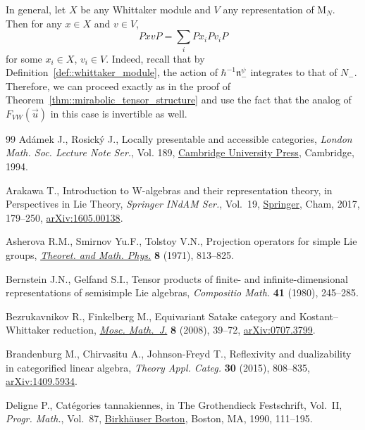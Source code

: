 \documentclass[11pt]{article}
\numberwithin{equation}{section}
\newcommand{\rM}{\mathrm{M}}
\newcommand{\n}{\mathfrak{n}}
\begin{document}
	\begin{Remark}
		\label{rmk::mirabolic_tensor_structure}
		In general, let $X$ be any Whittaker module and $V$ any representation of $\rM_N$. Then for any $x\in X$ and $v\in V$,
		\[
		PxvP = \sum\limits_i Px_i P v_i P
		\]
		for some $x_i\in X$, $v_i \in V$. Indeed, recall that by Definition~\ref{def::whittaker_module}, the action of $\hbar^{-1} \n_-^{\psi}$ integrates to that of $N_-$. Therefore, we can proceed exactly as in the proof of Theorem~\ref{thm::mirabolic_tensor_structure} and use the fact that the analog of $F_{VW}(\vec{u})$ in this case is invertible as well.
	\end{Remark}
\begin{thebibliography}{99}
Ad\'amek J., Rosick\'y J., Locally presentable and accessible categories,
 \textit{London Math. Soc. Lecture Note Ser.}, Vol. 189, \href{https://doi.org/10.1017/CBO9780511600579}{Cambridge University
 Press}, Cambridge, 1994.

Arakawa T., Introduction to {W}-algebras and their representation theory, in
 Perspectives in {L}ie {T}heory, \textit{Springer INdAM Ser.}, Vol.~19,
 \href{https://doi.org/10.1007/978-3-319-58971-8_4}{Springer}, Cham, 2017, 179--250, \href{https://arxiv.org/abs/1605.00138}{arXiv:1605.00138}.

Asherova R.M., Smirnov Yu.F., Tolstoy V.N., Projection operators for simple
 {L}ie groups, \href{https://doi.org/10.1007/BF01038003}{\textit{Theoret. and Math. Phys.}} \textbf{8} (1971), 813--825.

Bernstein J.N., Gelfand S.I., Tensor products of finite- and
 infinite-dimensional representations of semisimple {L}ie algebras,
 \textit{Compositio Math.} \textbf{41} (1980), 245--285.

Bezrukavnikov R., Finkelberg M., Equivariant {S}atake category and
 {K}ostant--{W}hittaker reduction, \href{https://doi.org/10.17323/1609-4514-2008-8-1-39-72}{\textit{Mosc. Math.~J.}} \textbf{8} (2008),
 39--72, \href{https://arxiv.org/abs/0707.3799}{arXiv:0707.3799}.

Brandenburg M., Chirvasitu A., Johnson-Freyd T., Reflexivity and dualizability
 in categorified linear algebra, \textit{Theory Appl. Categ.} \textbf{30}
 (2015), 808--835, \href{https://arxiv.org/abs/1409.5934}{arXiv:1409.5934}.

Deligne P., Cat\'egories tannakiennes, in The {G}rothendieck {F}estschrift,
 {V}ol.~{II}, \textit{Progr. Math.}, Vol.~87, \href{https://doi.org/10.1007/978-0-8176-4575-5_3}{Birkh\"auser Boston}, Boston, MA,
 1990, 111--195.


\end{thebibliography}
\end{document}
